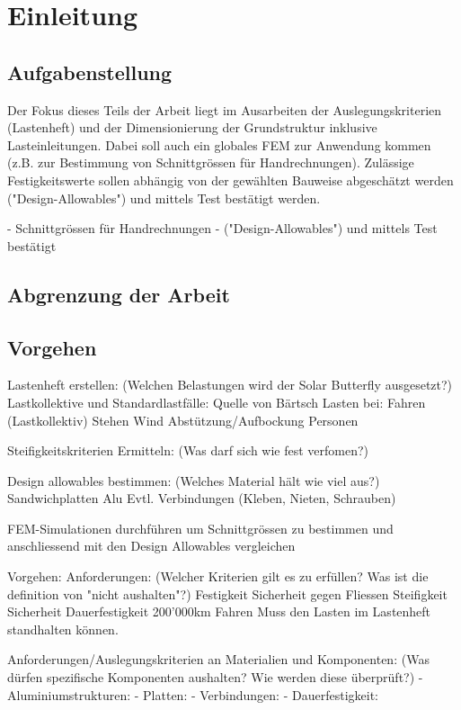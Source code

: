 \section{Einleitung}


\subsection{Aufgabenstellung}
Der Fokus dieses Teils der Arbeit liegt im Ausarbeiten der Auslegungskriterien (Lastenheft) und der Dimensionierung der Grundstruktur inklusive Lasteinleitungen.
Dabei soll auch ein globales FEM zur Anwendung kommen (z.B. zur Bestimmung von Schnittgrössen für Handrechnungen).
Zulässige Festigkeitswerte sollen abhängig von der gewählten Bauweise abgeschätzt werden ("Design-Allowables") und mittels Test bestätigt werden.

  - Schnittgrössen für Handrechnungen
  - ("Design-Allowables") und mittels Test bestätigt

\subsection{Abgrenzung der Arbeit}

\subsection{Vorgehen}
  Lastenheft erstellen: (Welchen Belastungen wird der Solar Butterfly ausgesetzt?)
    Lastkollektive und Standardlastfälle:
      Quelle von Bärtsch
    Lasten bei:
      Fahren (Lastkollektiv)
      Stehen
      Wind
      Abstützung/Aufbockung
      Personen

  Steifigkeitskriterien Ermitteln: (Was darf sich wie fest verfomen?)

  Design allowables bestimmen: (Welches Material hält wie viel aus?)
    Sandwichplatten
    Alu
    Evtl. Verbindungen (Kleben, Nieten, Schrauben)

  FEM-Simulationen durchführen um Schnittgrössen zu bestimmen und anschliessend mit den Design Allowables vergleichen


Vorgehen:
Anforderungen: (Welcher Kriterien gilt es zu erfüllen? Was ist die definition von "nicht aushalten"?)
  Festigkeit
  Sicherheit gegen Fliessen
  Steifigkeit
  Sicherheit
  Dauerfestigkeit 200'000km Fahren
  Muss den Lasten im Lastenheft standhalten können.

Anforderungen/Auslegungskriterien an Materialien und Komponenten: (Was dürfen spezifische Komponenten aushalten? Wie werden diese überprüft?)
  - Aluminiumstrukturen:
  - Platten:
  - Verbindungen:
  - Dauerfestigkeit:


